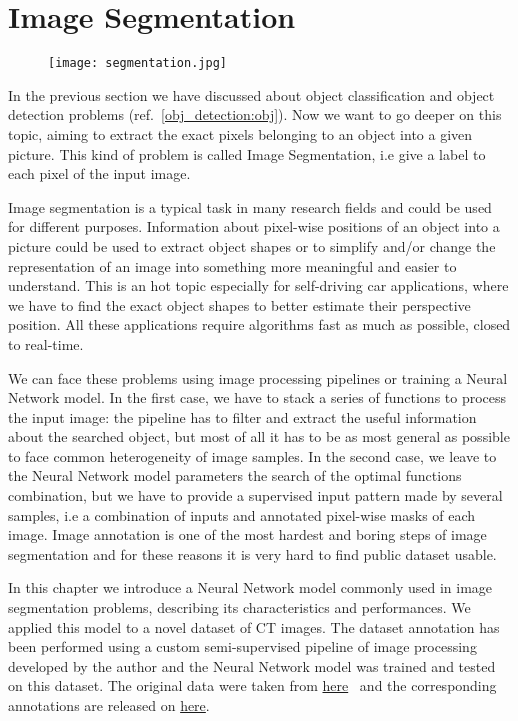 \documentclass{standalone}
\begin{document}
\section[Segmentation]{Image Segmentation}\label{segmentation:unet}

\begin{center}
\begin{figure}[htbp]
\centering
\texttt{[image: segmentation.jpg]}
\label{fig:segmentation}
\end{figure}
\end{center}

In the previous section we have discussed about object classification and object detection problems (ref.~\ref{obj_detection:obj}).
Now we want to go deeper on this topic, aiming to extract the exact pixels belonging to an object into a given picture.
This kind of problem is called Image Segmentation, i.e give a label to each pixel of the input image.

Image segmentation is a typical task in many research fields and could be used for different purposes.
Information about pixel-wise positions of an object into a picture could be used to extract object shapes or to simplify and/or change the representation of an image into something more meaningful and easier to understand.
This is an hot topic especially for self-driving car applications, where we have to find the exact object shapes to better estimate their perspective position.
All these applications require algorithms fast as much as possible, closed to real-time.

We can face these problems using image processing pipelines or training a Neural Network model.
In the first case, we have to stack a series of functions to process the input image: the pipeline has to filter and extract the useful information about the searched object, but most of all it has to be as most general as possible to face common heterogeneity of image samples.
In the second case, we leave to the Neural Network model parameters the search of the optimal functions combination, but we have to provide a supervised input pattern made by several samples, i.e a combination of inputs and annotated pixel-wise masks of each image.
Image annotation is one of the most hardest and boring steps of image segmentation and for these reasons it is very hard to find public dataset usable.

In this chapter we introduce a Neural Network model commonly used in image segmentation problems, describing its characteristics and performances.
We applied this model to a novel dataset of CT images.
The dataset annotation has been performed using a custom semi-supervised pipeline of image processing developed by the author and the Neural Network model was trained and tested on this dataset.
The original data were taken from \href{https://mrl.sci.utah.edu/software/normal-hip-image-data/}{here}~\cite{doi:10.1002/jor.22040} and the corresponding annotations are released on \href{}{here}. %
\end{document}
